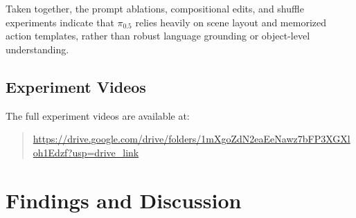 \documentclass{article}
\begin{document}
Taken together, the prompt ablations, compositional edits, and shuffle experiments indicate that $\pi_{0.5}$ relies heavily on scene layout and memorized action templates, rather than robust language grounding or object-level understanding.

\subsection{Experiment Videos}

The full experiment videos are available at:

\begin{quote}
\url{https://drive.google.com/drive/folders/1mXgoZdN2eaEeNawz7bFP3XGXloh1Edzf?usp=drive_link}
\end{quote}

\section{Findings and Discussion}



\end{document}
